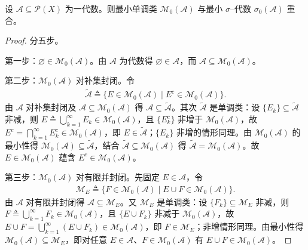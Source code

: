 \documentclass[../../main.tex]{subfiles}%
\begin{document}
\begin{theorem}\label{theorem:ch01-单调类定理}
设 $\mathcal{A}\subseteq\mathcal{P}(X)$ 为一代数。则最小单调类 $\mathcal{M}_0(\mathcal{A})$ 与最小 $\sigma$--代数 $\sigma_0(\mathcal{A})$ 重合。
\end{theorem}

\begin{proof}
分五步。

第一步：$\varnothing\in\mathcal{M}_0(\mathcal{A})$。由 $\mathcal{A}$ 为代数得 $\varnothing\in\mathcal{A}$，而 $\mathcal{A}\subseteq\mathcal{M}_0(\mathcal{A})$。

第二步：$\mathcal{M}_0(\mathcal{A})$ 对补集封闭。令
\begin{align*}
\widetilde{\mathcal{A}}\triangleq\{E\in\mathcal{M}_0(\mathcal{A})\mid E^c\in\mathcal{M}_0(\mathcal{A})\}.
\end{align*}
由 $\mathcal{A}$ 对补集封闭及 $\mathcal{A}\subseteq\mathcal{M}_0(\mathcal{A})$ 得 $\mathcal{A}\subseteq\widetilde{\mathcal{A}}$。其次 $\widetilde{\mathcal{A}}$ 是单调类：设 $\{E_k\}\subseteq\widetilde{\mathcal{A}}$ 非减，则 $E\triangleq\bigcup_{k=1}^\infty E_k\in\mathcal{M}_0(\mathcal{A})$，且 $\{E_k^c\}$ 非增于 $\mathcal{M}_0(\mathcal{A})$，故 $E^c=\bigcap_{k=1}^\infty E_k^c\in\mathcal{M}_0(\mathcal{A})$，即 $E\in\widetilde{\mathcal{A}}$；$\{E_k\}$ 非增的情形同理。由 $\mathcal{M}_0(\mathcal{A})$ 的最小性得 $\mathcal{M}_0(\mathcal{A})\subseteq\widetilde{\mathcal{A}}$，结合 $\widetilde{\mathcal{A}}\subseteq\mathcal{M}_0(\mathcal{A})$ 得 $\widetilde{\mathcal{A}}=\mathcal{M}_0(\mathcal{A})$。故 $E\in\mathcal{M}_0(\mathcal{A})$ 蕴含 $E^c\in\mathcal{M}_0(\mathcal{A})$。

第三步：$\mathcal{M}_0(\mathcal{A})$ 对有限并封闭。先固定 $E\in\mathcal{A}$，令
\begin{align*}
\mathcal{M}_E\triangleq\{F\in\mathcal{M}_0(\mathcal{A})\mid E\cup F\in\mathcal{M}_0(\mathcal{A})\}.
\end{align*}
由 $\mathcal{A}$ 对有限并封闭得 $\mathcal{A}\subseteq\mathcal{M}_E$。又 $\mathcal{M}_E$ 是单调类：设 $\{F_k\}\subseteq\mathcal{M}_E$ 非减，则 $F\triangleq\bigcup_{k=1}^\infty F_k\in\mathcal{M}_0(\mathcal{A})$，且 $\{E\cup F_k\}$ 非减于 $\mathcal{M}_0(\mathcal{A})$，故 $E\cup F=\bigcup_{k=1}^\infty(E\cup F_k)\in\mathcal{M}_0(\mathcal{A})$，即 $F\in\mathcal{M}_E$；非增情形同理。由最小性得 $\mathcal{M}_0(\mathcal{A})\subseteq\mathcal{M}_E$，即对任意 $E\in\mathcal{A}$、$F\in\mathcal{M}_0(\mathcal{A})$ 有 $E\cup F\in\mathcal{M}_0(\mathcal{A})$。


\end{proof}
\end{document}

